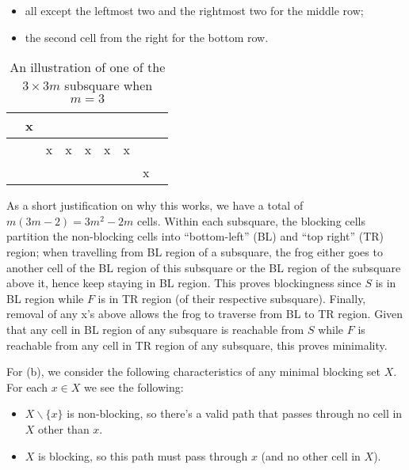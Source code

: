 \documentclass[11pt,a4paper]{article}
\begin{document}
\begin{enumerate}
\begin{itemize}
        	\item all except the leftmost two and the rightmost two for the middle row; 
        	
        	\item the second cell from the right for the bottom row. 
        \end{itemize}
        
        \begin{table}[H]
        	\centering
        	\begin{tabular}{|c|c|c|c|c|c|c|c|c|}
        		\hline 
        		& x & & & & & & & \\
        		\hline 
        		&  & x & x & x & x & x & & \\
        		\hline 
        		&  & & & & & & x & \\
        		\hline 
        	\end{tabular}
            \caption{An illustration of one of the $3\times 3m$ subsquare when $m=3$}
        \end{table}
        As a short justification on why this works, we have a total of $m(3m-2)=3m^2-2m$ cells. 
        Within each subsquare, the blocking cells partition the non-blocking cells into ``bottom-left'' (BL) and ``top right'' (TR) region; 
        when travelling from BL region of a subsquare, 
        the frog either goes to another cell of the BL region of this subsquare 
        or the BL region of the subsquare above it, 
        hence keep staying in BL region.  
        This proves blockingness since $S$ is in BL region while $F$ is in TR region (of their respective subsquare). 
        Finally, removal of any x's above allows the frog to traverse from BL to TR region. 
        Given that any cell in BL region of any subsquare is reachable from $S$ 
        while $F$ is reachable from any cell in TR region of any subsquare, 
        this proves minimality. 
        
        For (b), we consider the following characteristics of any minimal blocking set $X$. 
        For each $x\in X$ we see the following: 
        \begin{itemize}
        	\item $X\backslash \{x\}$ is non-blocking, so there's a valid path that passes through no cell in $X$ other than $x$. 
        	
        	\item $X$ is blocking, so this path must pass through $x$ (and no other cell in $X$). 
        \end{itemize}
        

\end{enumerate}
\end{document}
